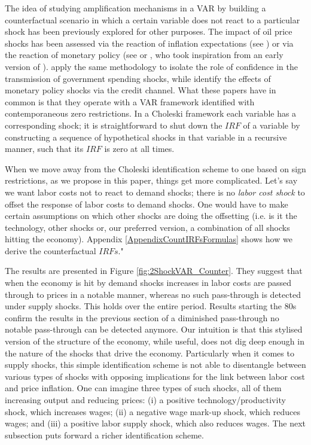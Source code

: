 \documentclass[11pt]{article}
\begin{document}
The idea of studying amplification mechanisms in a VAR by building a counterfactual scenario in which a certain variable does not react to a particular shock has been previously explored for other purposes. The impact of oil price shocks has been assessed via the reaction of inflation expectations (see \cite{Wong_2015}) or via the reaction of monetary policy (see \cite{Kilian_Lewis_2011} or \cite{Bernanke_Gertler_Watson_97}, who took inspiration from an early version of \cite{Sims_Zha_2006}). \cite{Bachmann_Sims_2012} apply the same methodology to isolate the role of confidence in the transmission of government spending shocks, while \cite{Ciccarelli_Maddaloni_Peydro_15} identify the effects of monetary policy shocks via the credit channel. What these papers have in common is that they operate with a VAR framework identified with contemporaneous zero restrictions. In a Choleski framework each variable has a corresponding shock; it is straightforward to shut down the $IRF$ of a variable by constructing a sequence of hypothetical shocks in that variable in a recursive manner, such that its $IRF$ is zero at all times. 

When we move away from the Choleski identification scheme to one based on sign restrictions, as we propose in this paper, things get more complicated. Let's say we want labor costs not to react to demand shocks; there is no \textit{labor cost shock} to offset the response of labor costs to demand shocks. One would have to make certain assumptions on which other shocks are doing the offsetting (i.e. is it the technology, other shocks or, our preferred version, a combination of all shocks hitting the economy). Appendix \ref{AppendixCountIRFsFormulas} shows how we derive the counterfactual $IRFs$."

The results are presented in Figure \ref{fig:2ShockVAR_Counter}. They suggest that when the economy is hit by demand shocks increases in labor costs are passed through to prices in a notable manner, whereas no such pass-through is detected under supply shocks. This holds over the entire period. Results starting the 80s confirm the results in the previous section of a diminished pass-through no notable pass-through can be detected anymore. Our intuition is that this stylised version of the structure of the economy, while useful, does not dig deep enough in the nature of the shocks that drive the economy. Particularly when it comes to supply shocks, this simple identification scheme is not able to disentangle between various types of shocks with opposing implications for the link between labor cost and price inflation. One can imagine three types of such shocks, all of them increasing output and reducing prices: (i) a positive technology/productivity shock, which increases wages; (ii) a negative wage mark-up shock, which reduces wages; and (iii) a positive labor supply shock, which also reduces wages. The next subsection puts forward a richer identification scheme.  
\end{document}
